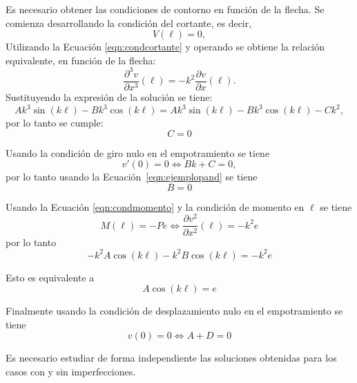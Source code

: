 Es necesario obtener las condiciones de contorno en función de la flecha. %
Se comienza desarrollando la condición del cortante, es decir,
%
\begin{equation}
	V(\ell) = 0,
\end{equation}
Utilizando la Ecuación \eqref{eqn:condcortante} y operando se obtiene la relación equivalente, en función de la flecha:
%
\begin{equation}
  \frac{\partial^3 v}{\partial x^3} (\ell) = - k^2 \frac{\partial v}{\partial x}(\ell).
\end{equation}
%
Sustituyendo la expresión de la solución se tiene:
%	
\begin{equation}
	Ak^3 \sin(k\ell) - Bk^3 \cos(k\ell) = Ak^3 \sin(k\ell) - Bk^3 \cos(k\ell) - C k^2,
\end{equation}
por lo tanto se cumple:
\begin{equation}\label{eqn:ejemplopand}
\boxed{
  C=0
}
\end{equation}

Usando la condición de giro nulo en el empotramiento se tiene
\begin{equation}
v'(0)=0 \Leftrightarrow  Bk + C = 0,
\end{equation}
%
por lo tanto usando la Ecuación~\eqref{eqn:ejemplopand} se tiene
\begin{equation}
\boxed{
B=0
}
\end{equation}

Usando la Ecuación \eqref{eqn:condmomento} y la condición de momento en $\ell$ se tiene
%
\begin{equation}
M(\ell) = -P e \Leftrightarrow \frac{\partial v^2}{\partial x^2} (\ell)  = - k^2 e
\end{equation}
%
por lo tanto
%
\begin{equation}
-k^2 A \cos(k\ell) - k^2 B \cos(k\ell) = -k^2 e
\end{equation}

Esto es equivalente a 
\begin{equation}\label{eqn:acos}
\boxed{
A \cos(k\ell)  = e
}
\end{equation}

Finalmente usando la condición de desplazamiento nulo en el empotramiento se tiene
%
\begin{equation}
v(0)=0  \Leftrightarrow \boxed{ A + D = 0}
\end{equation}

Es necesario estudiar de forma independiente las soluciones obtenidas para los casos con y sin imperfecciones.

